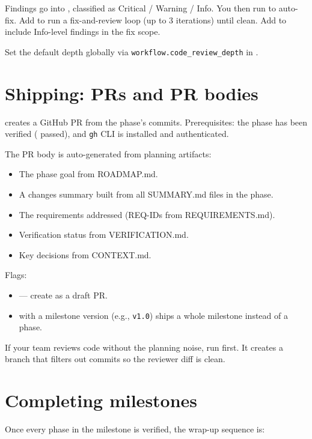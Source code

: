\documentclass[11pt,letterpaper,openany]{book}
\begin{document}
Findings go into , classified as Critical / Warning / Info. You then run  to auto-fix. Add  to run a fix-and-review loop (up to 3 iterations) until clean. Add  to include Info-level findings in the fix scope.

Set the default depth globally via \texttt{workflow.code\_review\_depth} in .

\section{Shipping: PRs and PR bodies}

 creates a GitHub PR from the phase's commits. Prerequisites: the phase has been verified ( passed), and \texttt{gh} CLI is installed and authenticated.

The PR body is auto-generated from planning artifacts:

\begin{itemize}[itemsep=2pt]
  \item The phase goal from ROADMAP.md.
  \item A changes summary built from all SUMMARY.md files in the phase.
  \item The requirements addressed (REQ-IDs from REQUIREMENTS.md).
  \item Verification status from VERIFICATION.md.
  \item Key decisions from CONTEXT.md.
\end{itemize}

Flags:
\begin{itemize}[itemsep=2pt]
  \item {} --- create as a draft PR.
  \item {} with a milestone version (e.g., \texttt{v1.0}) ships a whole milestone instead of a phase.
\end{itemize}

If your team reviews code without the planning noise, run  first. It creates a branch that filters out  commits so the reviewer diff is clean.

\section{Completing milestones}

Once every phase in the milestone is verified, the wrap-up sequence is:
\end{document}
